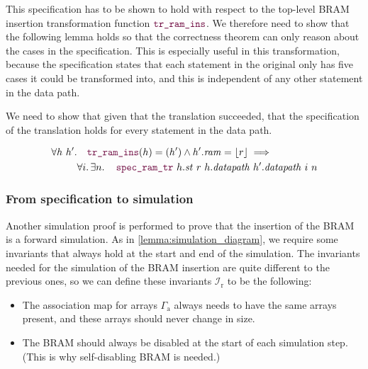This specification has to be shown to hold with respect to the top-level BRAM
insertion transformation function $\yhfunction{tr\_ram\_ins}$.  We therefore
need to show that the following lemma holds so that the correctness theorem can
only reason about the cases in the specification.  This is especially useful in
this transformation, because the specification states that each statement in the
original \htl{} only has five cases it could be transformed into, and this is
independent of any other statement in the data path.

\begin{lemma}
  We need to show that given that the translation succeeded, that the
  specification of the translation holds for every statement in the data path.

  \begin{equation*}
    \begin{aligned}
      \forall h\ h'\ldotp&\quad\yhfunction{tr\_ram\_ins}(h) = (h') \land
      h'.\mathit{ram} = \some{r} \implies\\
      &\forall i\ldotp \exists n\ldotp\quad\yhfunction{spec\_ram\_tr}\ h.\mathit{st}\ r\ h.\mathit{datapath}\ h'.\mathit{datapath}\ i\ n
    \end{aligned}
  \end{equation*}
\end{lemma}

\subsubsection{From specification to simulation}

Another simulation proof is performed to prove that the insertion of the
\gls{BRAM} is a forward simulation.  As in \cref{lemma:simulation_diagram}, we
require some invariants that always hold at the start and end of the simulation.
The invariants needed for the simulation of the \gls{BRAM} insertion are quite
different to the previous ones, so we can define these invariants
$\mathcal{I}_{\mathrm{r}}$ to be the following:

\begin{itemize}
\item The association map for arrays $\Gamma_{\mathrm{a}}$ always needs to have
  the same arrays present, and these arrays should never change in size.
\item The \gls{BRAM} should always be disabled at the start of each simulation
  step. (This is why self-disabling \gls{BRAM} is needed.)
\end{itemize}

